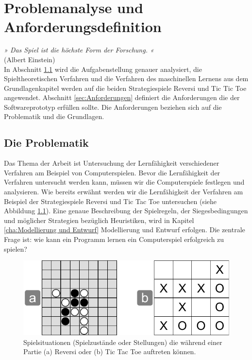 \chapter{Problemanalyse und Anforderungsdefinition}
\label{cha:pua}

\emph{» Das Spiel ist die höchste Form der Forschung. «} \\
(Albert Einstein) \\

In Abschnitt \ref{sec:Die Problematik} wird die Aufgabenstellung genauer analysiert, die Spieltheoretischen Verfahren und die Verfahren des maschinellen Lernens aus dem Grundlagenkapitel werden auf die beiden Strategiespiele Reversi und Tic Tic Toe angewendet. Abschnitt \ref{sec:Anforderungen} definiert die Anforderungen die der Softwareprototyp erfüllen sollte. Die Anforderungen beziehen sich auf die Problematik und die Grundlagen. 

\section{Die Problematik}
\label{sec:Die Problematik}
Das Thema der Arbeit ist Untersuchung der Lernfähigkeit verschiedener Verfahren am Beispiel von Computerspielen. Bevor die Lernfähigkeit der Verfahren untersucht werden kann, müssen wir die Computerspiele festlegen und analysieren. Wie bereits erwähnt werden wir die Lernfähigkeit der Verfahren am Beispiel der Strategiespiele Reversi und Tic Tac Toe untersuchen (siehe Abbildung \ref{fig:reversi_und_tictactoe}). Eine genaue Beschreibung der Spielregeln, der Siegesbedingungen und möglicher Strategien bezüglich Heuristiken, wird in Kapitel \ref{cha:Modellierung und Entwurf} Modellierung und Entwurf erfolgen. Die zentrale Frage ist: wie kann ein Programm lernen ein Computerspiel erfolgreich zu spielen? \\

\begin{figure}[!htbp]
  \centering
  \includegraphics[scale = 0.8]{inhalt/abbildungen/reversi_und_tictactoe.pdf}
  \caption{Spielsituationen (Spielzustände oder Stellungen) die während einer Partie (a) Reversi oder (b) Tic Tac Toe auftreten können.}
  \label{fig:reversi_und_tictactoe}
\end{figure} 

